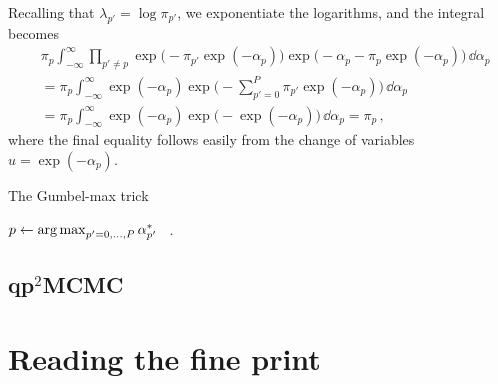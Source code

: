 \documentclass[12pt]{article} %
\newcommand{\argmax}{\operatornamewithlimits{arg\,max}}
\begin{document}
Recalling that $\lambda_{p'}=\log \pi_{p'}$, we exponentiate the logarithms, and the integral becomes
\begin{align*}
& \pi_p \int_{-\infty}^\infty  \prod_{p'\neq p} \exp\big( -\pi_{p'}\exp(-\alpha_p)\big) \exp  \big(-\alpha_p - \pi_p\exp(-\alpha_p) \big) \, \dd \alpha_p \\
&= \pi_p \int_{-\infty}^\infty \exp  (-\alpha_p ) \exp\big( -\sum_{p'=0}^P\pi_{p'}\exp(-\alpha_p)\big)  \, \dd \alpha_p  \\
&= \pi_p \int_{-\infty}^\infty \exp  (-\alpha_p ) \exp\big( -\exp(-\alpha_p)\big)  \, \dd \alpha_p  = \pi_p \, ,
\end{align*}
where the final equality follows easily from the change of variables $u=\exp(-\alpha_p)$.  


\begin{algorithm}
	\caption{The Gumbel-max trick}\label{alg:gm}
	$p \gets \argmax_{p'=0,\dots,P}\alpha^*_{p'}$\;
	\ .
	
\end{algorithm}

\subsection{qp$^2$MCMC}

\section{Reading the fine print}




\appendix




\end{document}
